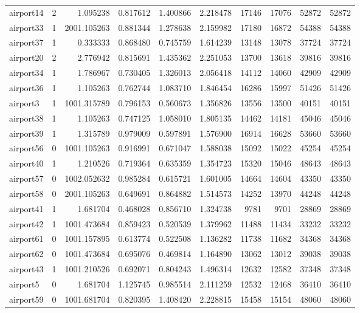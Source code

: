 \begin{longtable}{|l|r|r|r|r|r|r|r|r|r|}
airport14 & 2 & 1.095238 & 0.817612 & 1.400866 & 2.218478 & 17146 & 17076 & 52872 & 52872 \\
airport33 & 1 & 2001.105263 & 0.881344 & 1.278638 & 2.159982 & 17180 & 16872 & 54388 & 54388 \\
airport37 & 1 & 0.333333 & 0.868480 & 0.745759 & 1.614239 & 13148 & 13078 & 37724 & 37724 \\
airport20 & 2 & 2.776942 & 0.815691 & 1.435362 & 2.251053 & 13700 & 13618 & 39816 & 39816 \\
airport34 & 1 & 1.786967 & 0.730405 & 1.326013 & 2.056418 & 14112 & 14060 & 42909 & 42909 \\
airport36 & 1 & 1.105263 & 0.762744 & 1.083710 & 1.846454 & 16286 & 15997 & 51426 & 51426 \\
airport3 & 1 & 1001.315789 & 0.796153 & 0.560673 & 1.356826 & 13556 & 13500 & 40151 & 40151 \\
airport38 & 1 & 1.105263 & 0.747125 & 1.058010 & 1.805135 & 14462 & 14181 & 45046 & 45046 \\
airport39 & 1 & 1.315789 & 0.979009 & 0.597891 & 1.576900 & 16914 & 16628 & 53660 & 53660 \\
airport56 & 0 & 1001.105263 & 0.916991 & 0.671047 & 1.588038 & 15092 & 15022 & 45254 & 45254 \\
airport40 & 1 & 1.210526 & 0.719364 & 0.635359 & 1.354723 & 15320 & 15046 & 48643 & 48643 \\
airport57 & 0 & 1002.052632 & 0.985284 & 0.615721 & 1.601005 & 14664 & 14604 & 43350 & 43350 \\
airport58 & 0 & 2001.105263 & 0.649691 & 0.864882 & 1.514573 & 14252 & 13970 & 44248 & 44248 \\
airport41 & 1 & 1.681704 & 0.468028 & 0.856710 & 1.324738 & 9781 & 9701 & 28869 & 28869 \\
airport42 & 1 & 1001.473684 & 0.859423 & 0.520539 & 1.379962 & 11488 & 11434 & 33232 & 33232 \\
airport61 & 0 & 1001.157895 & 0.613774 & 0.522508 & 1.136282 & 11738 & 11682 & 34368 & 34368 \\
airport62 & 0 & 1001.473684 & 0.695076 & 0.469814 & 1.164890 & 13062 & 13012 & 39038 & 39038 \\
airport43 & 1 & 1001.210526 & 0.692071 & 0.804243 & 1.496314 & 12632 & 12582 & 37348 & 37348 \\
airport5 & 0 & 1.681704 & 1.125745 & 0.985514 & 2.111259 & 12532 & 12468 & 36410 & 36410 \\
airport59 & 0 & 1001.681704 & 0.820395 & 1.408420 & 2.228815 & 15458 & 15154 & 48060 & 48060 \\

\end{longtable}
